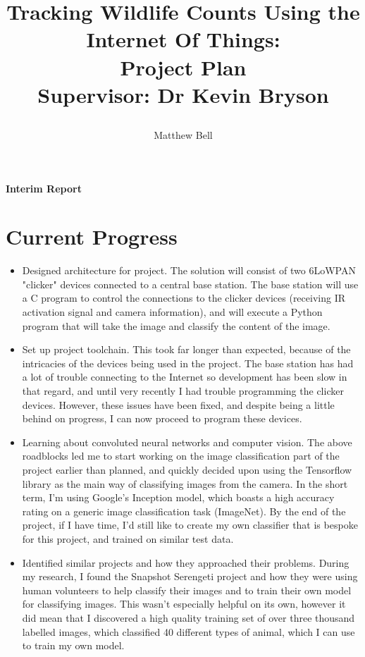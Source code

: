 \documentclass{article}
\title{\protect\parbox{\textwidth}{\protect\centering %
Tracking Wildlife Counts Using the Internet Of Things: \\
Project Plan \\ \vspace{1em}
\large Supervisor: Dr Kevin Bryson}} \author{Matthew Bell}
\begin{document}
 \maketitle

\begin{center}
    \huge \bfseries \headingfont Interim Report
\end{center}

\section*{Current Progress}
\begin{itemize}
    \item Designed architecture for project. The solution will consist of two
    6LoWPAN "clicker" devices connected to a central base station. The base
    station will use a C program to control the connections to the clicker
    devices (receiving IR activation signal and camera information), and will
    execute a Python program that will take the image and classify the
    content of the image.
    \item Set up project toolchain. This took far longer than expected,
    because of the intricacies of the devices being used in the project. The
    base station has had a lot of trouble connecting to the Internet so
    development has been slow in that regard, and until very recently I had
    trouble programming the clicker devices. However, these issues have been
    fixed, and despite being a little behind on progress, I can now proceed
    to program these devices.
    \item Learning about convoluted neural networks and computer vision. The
    above roadblocks led me to start working on the image classification part
    of the project earlier than planned, and quickly decided upon using the
    Tensorflow library as the main way of classifying images from the camera.
    In the short term, I'm using Google's Inception model, which boasts a
    high accuracy rating on a generic image classification task (ImageNet).
    By the end of the project, if I have time, I'd still like to create my
    own classifier that is bespoke for this project, and trained on similar
    test data.
    \item Identified similar projects and how they approached their problems.
    During my research, I found the Snapshot Serengeti project and how they
    were using human volunteers to help classify their images and to train
    their own model for classifying images. This wasn't especially helpful on
    its own, however it did mean that I discovered a high quality training
    set of over three thousand labelled images, which classified 40 different
    types of animal, which I can use to train my own model.
\end{itemize}
\end{document}
